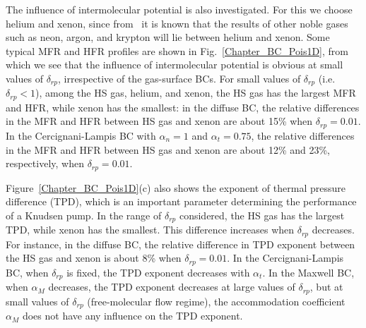The influence of intermolecular potential is also investigated. For this we choose helium and xenon, since from~\cite{Sharipov2009} it is known that the results of other noble gases such as neon, argon, and krypton will lie between helium and xenon. Some typical MFR and HFR profiles are shown in Fig.~\ref{Chapter_BC_Pois1D}, from which we see that the influence of intermolecular potential is obvious at small values of $\delta_{rp}$, irrespective of the gas-surface  BCs. For small values of $\delta_{rp}$ (i.e. $\delta_{rp} <1$), among the HS gas, helium, and xenon, the HS gas has the largest MFR and HFR, while xenon has the smallest: in the diffuse  BC, the relative differences in the MFR and HFR between HS gas and xenon are about 15\% when $\delta_{rp} =0.01$. In the Cercignani-Lampis  BC with $\alpha _{n}=1$ and $\alpha _{t}=0.75$, the relative differences in the MFR and HFR between HS gas and xenon are about 12\% and 23\%, respectively, when $\delta_{rp} =0.01$.


Figure~\ref{Chapter_BC_Pois1D}(c) also shows the exponent of thermal pressure difference (TPD), which is an important parameter determining the performance of a Knudsen pump. 
In the range of $\delta_{rp} $ considered, the HS gas has the largest TPD, while xenon has the smallest. This difference increases when $\delta_{rp} $ decreases. For instance, in the diffuse  BC, the relative difference in TPD exponent between the HS gas and xenon is about 8\% when $\delta_{rp} =0.01$. In the Cercignani-Lampis  BC, when $\delta_{rp}$ is fixed, the TPD exponent decreases with $\alpha _{t}$. In the Maxwell  BC, when $\alpha _{M}$ decreases, the TPD exponent decreases at large values of $\delta_{rp} $, but at small values of $\delta_{rp} $ (free-molecular flow regime), the  accommodation coefficient $\alpha _{M}$ does not have any influence on the TPD exponent.







%
%





